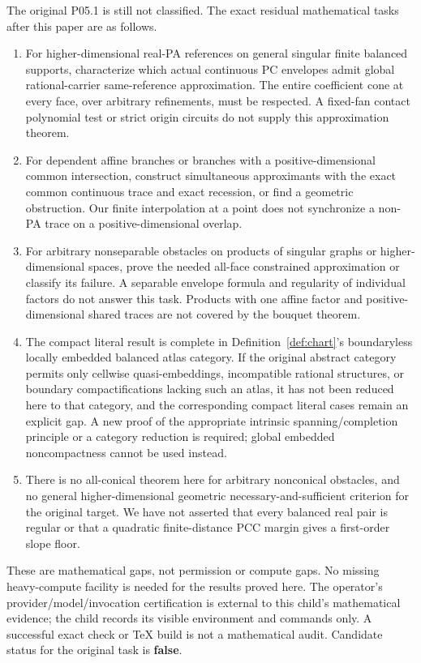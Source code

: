 \documentclass[11pt]{article}
\theoremstyle{definition}\newtheorem{definition}[theorem]{Definition}
\theoremstyle{remark}\newtheorem{remark}[theorem]{Remark}
\begin{document}
The original P05.1 is still not classified. The exact residual mathematical tasks after this paper are as follows.
\begin{enumerate}
\item For higher-dimensional real-PA references on general singular finite balanced supports, characterize which actual continuous PC envelopes admit global rational-carrier same-reference approximation. The entire coefficient cone at every face, over arbitrary refinements, must be respected. A fixed-fan contact polynomial test or strict origin circuits do not supply this approximation theorem.
\item For dependent affine branches or branches with a positive-dimensional common intersection, construct simultaneous approximants with the exact common continuous trace and exact recession, or find a geometric obstruction. Our finite interpolation at a point does not synchronize a non-PA trace on a positive-dimensional overlap.
\item For arbitrary nonseparable obstacles on products of singular graphs or higher-dimensional spaces, prove the needed all-face constrained approximation or classify its failure. A separable envelope formula and regularity of individual factors do not answer this task. Products with one affine factor and positive-dimensional shared traces are not covered by the bouquet theorem.
\item The compact literal result is complete in Definition~\ref{def:chart}'s boundaryless locally embedded balanced atlas category. If the original abstract category permits only cellwise quasi-embeddings, incompatible rational structures, or boundary compactifications lacking such an atlas, it has not been reduced here to that category, and the corresponding compact literal cases remain an explicit gap. A new proof of the appropriate intrinsic spanning/completion principle or a category reduction is required; global embedded noncompactness cannot be used instead.
\item There is no all-conical theorem here for arbitrary nonconical obstacles, and no general higher-dimensional geometric necessary-and-sufficient criterion for the original target. We have not asserted that every balanced real pair is regular or that a quadratic finite-distance PCC margin gives a first-order slope floor.
\end{enumerate}
These are mathematical gaps, not permission or compute gaps. No missing heavy-compute facility is needed for the results proved here. The operator's provider/model/invocation certification is external to this child's mathematical evidence; the child records its visible environment and commands only. A successful exact check or TeX build is not a mathematical audit. Candidate status for the original task is \textbf{false}.
\end{document}
